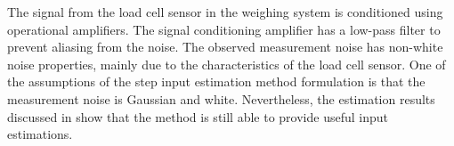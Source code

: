 The signal from the load cell sensor in the weighing system is conditioned using operational amplifiers.
The signal conditioning amplifier has a low-pass filter to prevent aliasing from the noise.
The observed measurement noise has non-white noise properties, mainly due to the characteristics of the load cell sensor.
One of the assumptions of the step input estimation method formulation is that the measurement noise is Gaussian and white. 
Nevertheless, the estimation results discussed in \citet{QuintanaTIM} show that the method is still able to provide useful input estimations.

